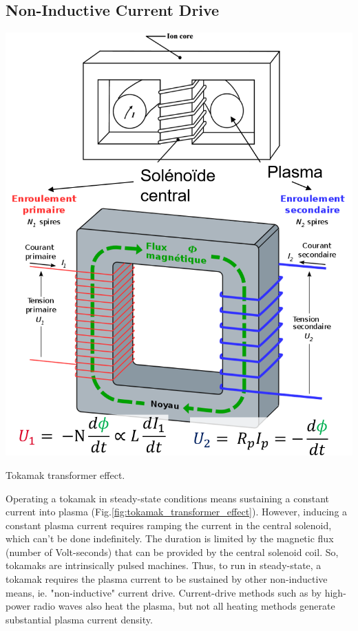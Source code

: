 \subsection{Non-Inductive Current Drive}
\begin{marginfigure}[-3cm]
	\includegraphics[width=1\linewidth]{figures/chap1/tokamak_transformer_effect}
	\caption{Tokamak transformer effect.}
	\label{fig:tokamak_transformer_effect}
\end{marginfigure}
Operating a tokamak in steady-state conditions means sustaining a constant current into plasma (Fig.\ref{fig:tokamak_transformer_effect}). However, inducing a constant plasma current requires ramping the current in the central solenoid, which can't be done indefinitely. The duration is limited by the magnetic flux (number of Volt-seconds) that can be provided by the central solenoid coil. So, tokamaks are intrinsically pulsed machines.
Thus, to run in steady-state, a tokamak requires the plasma current to be sustained by other non-inductive means, ie. "non-inductive" current drive. Current-drive methods such as by high-power radio waves also heat the plasma, but not all heating methods generate substantial plasma current density. 



